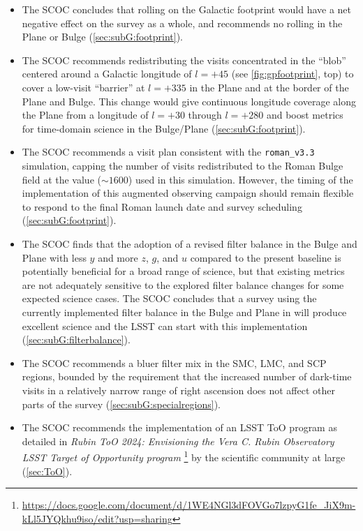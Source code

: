 \begin{itemize}
\item The SCOC concludes that rolling on the Galactic footprint would have a net negative effect on the survey as a whole, and recommends no rolling in the Plane or Bulge (\autoref{sec:subG:footprint}).


\item The SCOC recommends redistributing the visits concentrated in the ``blob'' centered around a Galactic longitude of $l=+45$ (see \autoref{fig:gpfootprint}, top) to cover a low-visit ``barrier'' at $l=+335$ in the Plane and at the border of the Plane and Bulge. This change would give continuous longitude coverage along the Plane from a longitude of $l=+30$  through $l=+280$ and boost metrics for time-domain science in the Bulge/Plane (\autoref{sec:subG:footprint}).

\item The SCOC recommends a visit plan consistent with the \texttt{roman\_v3.3} simulation, capping the number of visits redistributed to the Roman Bulge field at the value ($\sim 1600$) used in this simulation. However, the timing of the implementation of this augmented observing campaign should remain flexible to respond to the final Roman launch date and survey scheduling (\autoref{sec:subG:footprint}).

\item The SCOC finds that the adoption of a revised filter balance in the Bulge and Plane with less $y$ and more $z$, $g$, and $u$ compared to the present baseline is potentially beneficial for a broad range of science, but that existing metrics are not adequately sensitive to the explored filter balance changes for some expected science cases. The SCOC concludes that a survey using the currently implemented filter balance in the Bulge and Plane in  will produce excellent science and the LSST can start with this implementation (\autoref{sec:subG:filterbalance}).

\item The SCOC recommends a bluer filter mix in the SMC, LMC, and SCP regions, bounded by the requirement that the increased number of dark-time visits in a relatively narrow range of right ascension does not affect other parts of the survey (\autoref{sec:subG:specialregions}).

\item The SCOC recommends the implementation of an LSST ToO program as detailed in \emph{Rubin ToO 2024: 
Envisioning the Vera C. Rubin Observatory LSST Target of Opportunity program
}\footnote{\url{https://docs.google.com/document/d/1WE4NGl3dFOVGo7lzpyG1fe_JiX9m-kLl5JYQkhu9iso/edit?usp=sharing}} by the scientific community at large (\autoref{sec:ToO}).


\end{itemize}
